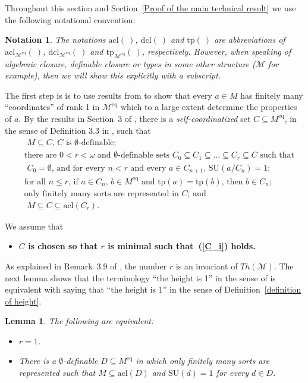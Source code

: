 \documentclass[11pt, twoside]{amsart}
\newtheorem{lem}[theor]{Lemma}
\newtheorem{notation}[theor]{Notation}
\numberwithin{equation}{section}
\newcommand{\tp}{\mathrm{tp}}
\newcommand{\acl}{\mathrm{acl}}
\newcommand{\dcl}{\mathrm{dcl}}
\newcommand{\es}{\emptyset}
\newcommand{\su}{\mathrm{SU}}
\newcommand{\meq}{^{\mathrm{eq}}}
\newcommand{\mcM}{\mathcal{M}}
\begin{document}
\noindent
Throughout this section and Section~\ref{Proof of the main technical result} we use the following notational convention:

\begin{notation}\label{notation for acl etc}{\rm
The notations 
$\acl( \ )$, $\dcl( \ )$ and $\tp( \ )$ are abbreviations of
$\acl_{\mcM\meq}( \ )$, $\dcl_{\mcM\meq}( \ )$ and $\tp_{\mcM\meq}( \ )$, respectively.
However, when speaking of algebraic closure, definable closure or types in some other structure ($\mcM$ for example),
then we will show this explicitly with a subscript.
}\end{notation}


\noindent
The first step is is to use results from \cite{Djo06} to show that every $a \in M$ has finitely many ``coordinates'' of rank 1 in $\mcM\meq$
which to a large extent determine the properties of $a$.
By the results in Section~3 of \cite{Djo06},
there is a {\em self-coordinatized} set $C \subseteq M\meq$, in the sense of Definition 3.3 in \cite{Djo06}, such that
\begin{align}\label{C_i}
&\text{  $M \subseteq C$, $C$ is $\es$-definable;} \\
&\text{ there are $0 < r < \omega$ and $\es$-definable sets 
$C_0 \subseteq C_1 \subseteq \ldots \subseteq C_r \subseteq C$ such that} \nonumber \\
&\text{ $C_0 = \es$, and for every $n < r$ and every $a \in C_{n+1}$, $\su(a/C_n) = 1$;} \nonumber \\
&\text{ for all $n \leq r$, if $a \in C_n$, $b \in M\meq$ and $\tp(a) = \tp(b)$, then $b \in C_n$;} \nonumber \\
&\text{ only finitely many sorts are represented in $C$; and} \nonumber \\
&\text{ $M \subseteq C \subseteq \acl(C_r)$.} \nonumber
\end{align}

\noindent
We assume that 
\begin{itemize}
\item[]{\bf $C$ is chosen so that $r$ is minimal such that~(\ref{C_i}) holds.}
\end{itemize}
As explained in Remark~3.9 of \cite{Djo06}, the number $r$ is an invariant of $Th(\mcM)$.
The next lemma shows that the terminology ``the height is 1'' in the sense of \cite{Djo06} 
is equivalent with saying that ``the height is 1'' in the sense of Definition~\ref{definition of height}.

\begin{lem}\label{height and existence of a coordinatizing rank one set}
The following are equivalent:
\begin{itemize}
\item[(1)] $r = 1$.
\item[(2)] There is a $\es$-definable $D \subseteq M\meq$ in which only finitely many sorts are represented
such that $M \subseteq \acl(D)$ and $\su(d) = 1$ for every $d \in D$.
\end{itemize}
\end{lem}
\end{document}
